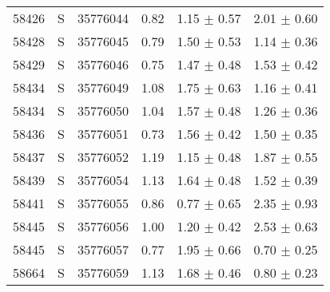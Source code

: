 \begin{longtable*}[c]{cccccc}
58426 & S & 35776044 & 0.82 & 1.15 $\pm$ 0.57 & 2.01 $\pm$ 0.60 \\ 
58428 & S & 35776045 & 0.79 & 1.50 $\pm$ 0.53 & 1.14 $\pm$ 0.36 \\ 
58429 & S & 35776046 & 0.75 & 1.47 $\pm$ 0.48 & 1.53 $\pm$ 0.42 \\ 
58434 & S & 35776049 & 1.08 & 1.75 $\pm$ 0.63 & 1.16 $\pm$ 0.41 \\ 
58434 & S & 35776050 & 1.04 & 1.57 $\pm$ 0.48 & 1.26 $\pm$ 0.36 \\ 
58436 & S & 35776051 & 0.73 & 1.56 $\pm$ 0.42 & 1.50 $\pm$ 0.35 \\ 
58437 & S & 35776052 & 1.19 & 1.15 $\pm$ 0.48 & 1.87 $\pm$ 0.55 \\ 
58439 & S & 35776054 & 1.13 & 1.64 $\pm$ 0.48 & 1.52 $\pm$ 0.39 \\ 
58441 & S & 35776055 & 0.86 & 0.77 $\pm$ 0.65 & 2.35 $\pm$ 0.93 \\ 
58445 & S & 35776056 & 1.00 & 1.20 $\pm$ 0.42 & 2.53 $\pm$ 0.63 \\ 
58445 & S & 35776057 & 0.77 & 1.95 $\pm$ 0.66 & 0.70 $\pm$ 0.25 \\ 
58664 & S & 35776059 & 1.13 & 1.68 $\pm$ 0.46 & 0.80 $\pm$ 0.23 \\ 
\hline

\end{longtable*}


